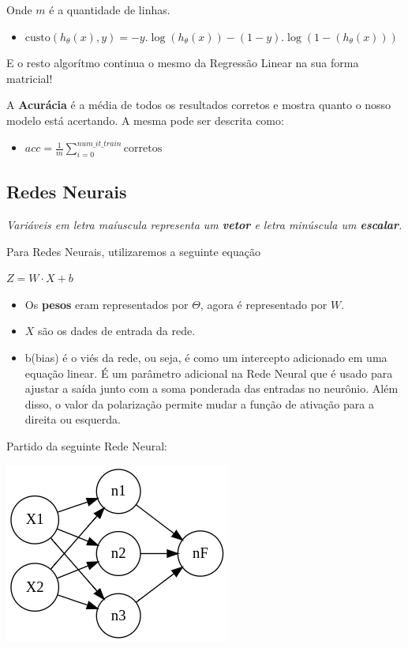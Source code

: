 \documentclass[12pt]{article}
\providecommand{\tightlist}{%
      \setlength{\itemsep}{0pt}\setlength{\parskip}{0pt}}
\begin{document}
Onde \(m\) é a quantidade de linhas.

\begin{itemize}
\tightlist
\item
  \(\text{custo}(h_\theta(x),y)=-y.\log(h_\theta(x))-(1-y).\log(1-(h_\theta(x)))\)
\end{itemize}

E o resto algorítmo continua o mesmo da Regressão Linear na sua forma
matricial!

A \textbf{Acurácia} é a média de todos os resultados corretos e mostra
quanto o nosso modelo está acertando. A mesma pode ser descrita como:

\begin{itemize}
\tightlist
\item
  \(acc=\frac{1}{m}\sum\limits_{i=0}^{num\_it\_train}\text{corretos}\)
\end{itemize}

\hypertarget{redes-neurais}{%
\subsection{\texorpdfstring{\textbf{Redes
Neurais}}{Redes Neurais}}\label{redes-neurais}}

\emph{Variáveis em letra maíuscula representa um \textbf{vetor} e letra
minúscula um \textbf{escalar}.}

Para Redes Neurais, utilizaremos a seguinte equação

\(Z = W \cdot X + b\)

\begin{itemize}
\item
  Os \textbf{pesos} eram representados por \(\Theta\), agora é
  representado por \(W\).
\item
  \(X\) são os dades de entrada da rede.
\item
  b(bias) é o viés da rede, ou seja, é como um intercepto adicionado em
  uma equação linear. É um parâmetro adicional na Rede Neural que é
  usado para ajustar a saída junto com a soma ponderada das entradas no
  neurônio. Além disso, o valor da polarização permite mudar a função de
  ativação para a direita ou esquerda.
\end{itemize}

Partido da seguinte Rede Neural:

\includegraphics{imgs/graphviz.png}
\end{document}
